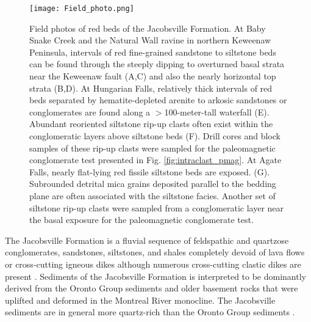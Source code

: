 \documentclass[draft]{agujournal2019}
\begin{document}
\begin{figure}[h!]
\centering
\texttt{[image: Field\_photo.png]}
\caption{\scriptsize Field photos of red beds of the Jacobsville Formation. At Baby Snake Creek and the Natural Wall ravine in northern Keweenaw Peninsula, intervals of red fine-grained sandstone to siltstone beds can be found through the steeply dipping to overturned basal strata near the Keweenaw fault (A,C) and also the nearly horizontal top strata (B,D). At Hungarian Falls, relatively thick intervals of red beds separated by hematite-depleted arenite to arkosic sandstones or conglomerates are found along a $>$100-meter-tall waterfall (E). Abundant reoriented siltstone rip-up clasts often exist within the conglomeratic layers above siltstone beds (F). Drill cores and block samples of these rip-up clasts were sampled for the paleomagnetic conglomerate test presented in Fig. \ref{fig:intraclast_pmag}. At Agate Falls, nearly flat-lying red fissile siltstone beds are exposed. (G). Subrounded detrital mica grains deposited parallel to the bedding plane are often associated with the siltstone facies. Another set of siltstone rip-up clasts were sampled from a conglomeratic layer near the basal exposure for the paleomagnetic conglomerate test. }
\label{fig:Field_photo}
\end{figure}

The Jacobsville Formation is a fluvial sequence of feldspathic and quartzose conglomerates, sandstones, siltstones, and shales completely devoid of lava flows or cross-cutting igneous dikes although numerous  cross-cutting clastic dikes are present \cite{Hamblin1958a}. Sediments of the Jacobsville Formation is interpreted to be dominantly derived from the Oronto Group sediments and older basement rocks that were uplifted and deformed in the Montreal River monocline. The Jacobsville sediments are in general more quartz-rich than the Oronto Group sediments \cite{Hamblin1958a}. 
\end{document}
